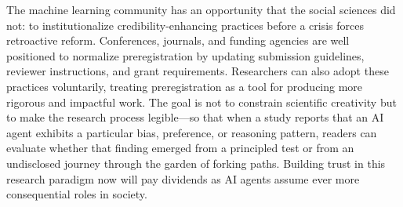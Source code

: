 \documentclass{article}
\theoremstyle{plain}
\theoremstyle{definition}
\theoremstyle{remark}
\begin{document}
The machine learning community has an opportunity that the social sciences did not: to institutionalize credibility-enhancing practices before a crisis forces retroactive reform. Conferences, journals, and funding agencies are well positioned to normalize preregistration by updating submission guidelines, reviewer instructions, and grant requirements. Researchers can also adopt these practices voluntarily, treating preregistration as a tool for producing more rigorous and impactful work. The goal is not to constrain scientific creativity but to make the research process legible—so that when a study reports that an AI agent exhibits a particular bias, preference, or reasoning pattern, readers can evaluate whether that finding emerged from a principled test or from an undisclosed journey through the garden of forking paths. Building trust in this research paradigm now will pay dividends as AI agents assume ever more consequential roles in society.












\newpage
\appendix
\onecolumn
\end{document}
